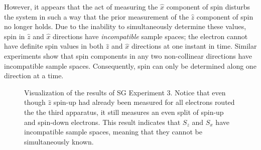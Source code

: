 However, it appears that the act of measuring the $\hat{x}$ component of spin disturbs the system in such a way that the prior measurement of the $\hat{z}$ component of spin no longer holds. Due to the inability to simultaneously determine these values, spin in $\hat{z}$ and $\hat{x}$ directions have \textit{incompatible} sample spaces; the electron cannot have definite spin values in both $\hat{z}$ and $\hat{x}$ directions at one instant in time. Similar experiments show that spin components in any two non-collinear directions have incompatible sample spaces. Consequently, spin can only be determined along one direction at a time.

\begin{figure}
\centering\CaptionFontSize
{}

\caption[Results of Stern-Gerlach Experiment 3]
{Visualization of the results of SG Experiment 3. Notice that even though $\hat{z}$ spin-up had already been measured for all electrons routed the the third apparatus, it still measures an even split of spin-up and spin-down electrons. This result indicates that $S_z$ and $S_x$ have incompatible sample spaces, meaning that they cannot be simultaneously known. }
\label{Figure:Exp 3}
\end{figure}
